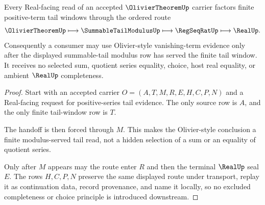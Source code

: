 \begin{theorem}
\label{thm:olivier-theorem-tail-handoff}
Every Real-facing read of an accepted $\OlivierTheoremUp$ carrier factors finite positive-term tail windows through the ordered route
$$
\OlivierTheoremUp \longmapsto \SummableTailModulusUp \longmapsto \RegSeqRatUp \longmapsto \RealUp .
$$
Consequently a consumer may use Olivier-style vanishing-term evidence only after the displayed summable-tail modulus row has served the finite tail window. It receives no selected sum, quotient series equality, choice, host real equality, or ambient $\RealUp$ completeness.
\end{theorem}
\begin{proof}
Start with an accepted carrier $O=(A,T,M,R,E,H,C,P,N)$ and a Real-facing request for positive-series tail evidence. The only source row is $A$, and the only finite tail-window row is $T$.

The handoff is then forced through $M$. This makes the Olivier-style conclusion a finite modulus-served tail read, not a hidden selection of a sum or an equality of quotient series.

Only after $M$ appears may the route enter $R$ and then the terminal $\RealUp$ seal $E$. The rows $H,C,P,N$ preserve the same displayed route under transport, replay it as continuation data, record provenance, and name it locally, so no excluded completeness or choice principle is introduced downstream.
\end{proof}





